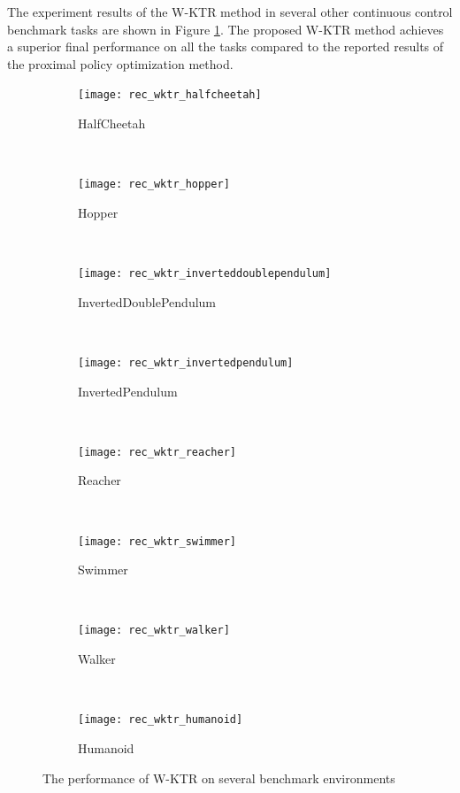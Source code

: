 The experiment results of the W-KTR method in several other continuous control benchmark tasks are shown in Figure \ref{fig:wktr_bench}. The proposed W-KTR method achieves a superior final performance on all the tasks compared to the reported results of the proximal policy optimization method. 
\begin{figure}[!htbp]
	\centering
	\begin{subfigure}[t]{0.4\textwidth}
		\centering
		\texttt{[image: rec\_wktr\_halfcheetah]}
		\caption{HalfCheetah}
	\end{subfigure}%
	~ 
	\begin{subfigure}[t]{0.4\textwidth}
		\centering
		\texttt{[image: rec\_wktr\_hopper]}
		\caption{Hopper}
	\end{subfigure}
	~ 
	\begin{subfigure}[t]{0.4\textwidth}
		\centering
		\texttt{[image: rec\_wktr\_inverteddoublependulum]}
		\caption{InvertedDoublePendulum}
	\end{subfigure}
	~ 
	\begin{subfigure}[t]{0.4\textwidth}
		\centering
		\texttt{[image: rec\_wktr\_invertedpendulum]}
		\caption{InvertedPendulum}
	\end{subfigure}
	~ 
	\begin{subfigure}[t]{0.4\textwidth}
		\centering
		\texttt{[image: rec\_wktr\_reacher]}
		\caption{Reacher}
	\end{subfigure}
	~ 
	\begin{subfigure}[t]{0.4\textwidth}
		\centering
		\texttt{[image: rec\_wktr\_swimmer]}
		\caption{Swimmer}
	\end{subfigure}
	~ 
	\begin{subfigure}[t]{0.4\textwidth}
		\centering
		\texttt{[image: rec\_wktr\_walker]}
		\caption{Walker}
	\end{subfigure}
	~ 
	\begin{subfigure}[t]{0.4\textwidth}
		\centering
		\texttt{[image: rec\_wktr\_humanoid]}
		\caption{Humanoid}
	\end{subfigure}

	\caption{The performance of W-KTR on several benchmark environments}
	\label{fig:wktr_bench}
\end{figure}
